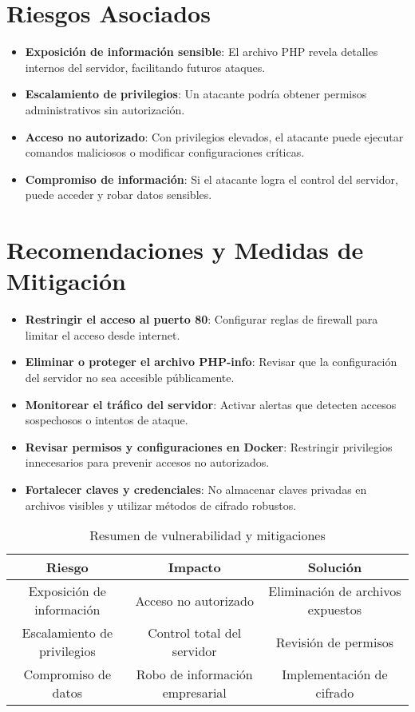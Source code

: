 \section{Riesgos Asociados}
\begin{itemize}
    \item \textbf{Exposición de información sensible}: El archivo PHP revela detalles internos del servidor, facilitando futuros ataques.
    \item \textbf{Escalamiento de privilegios}: Un atacante podría obtener permisos administrativos sin autorización.
    \item \textbf{Acceso no autorizado}: Con privilegios elevados, el atacante puede ejecutar comandos maliciosos o modificar configuraciones críticas.
    \item \textbf{Compromiso de información}: Si el atacante logra el control del servidor, puede acceder y robar datos sensibles.
\end{itemize}

\section{Recomendaciones y Medidas de Mitigación}
\begin{itemize}
    \item \textbf{Restringir el acceso al puerto 80}: Configurar reglas de firewall para limitar el acceso desde internet.
    \item \textbf{Eliminar o proteger el archivo PHP-info}: Revisar que la configuración del servidor no sea accesible públicamente.
    \item \textbf{Monitorear el tráfico del servidor}: Activar alertas que detecten accesos sospechosos o intentos de ataque.
    \item \textbf{Revisar permisos y configuraciones en Docker}: Restringir privilegios innecesarios para prevenir accesos no autorizados.
    \item \textbf{Fortalecer claves y credenciales}: No almacenar claves privadas en archivos visibles y utilizar métodos de cifrado robustos.
\end{itemize}

\begin{table}[H]
    \centering
    \caption{Resumen de vulnerabilidad y mitigaciones}
    \begin{tabular}{|c|c|c|}
    \hline
    \textbf{Riesgo} & \textbf{Impacto} & \textbf{Solución} \\ \hline
    Exposición de información & Acceso no autorizado & Eliminación de archivos expuestos \\ \hline
    Escalamiento de privilegios & Control total del servidor & Revisión de permisos \\ \hline
    Compromiso de datos & Robo de información empresarial & Implementación de cifrado \\ \hline
    \end{tabular}
    \label{tab:resumen}
\end{table}

